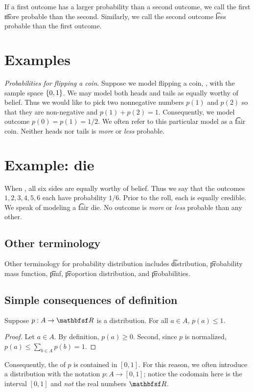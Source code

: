 If a first outcome has a larger probability than a second outcome, we call the first \t{more probable} than the second.
Similarly, we call the second outcome \t{less probable} than the first outcome.

\section*{Examples}

\textit{Probabilities for flipping a coin}.
Suppose we model flipping a coin, , with the sample space $\{0,1\}$.
We may model both heads and tails as equally worthy of belief.
Thus we would like to pick two nonnegative numbers $p(1)$ and $p(2)$ so that they are non-negative and $p(1) + p(2) = 1$.
Consequently, we model outcome $p(0) = p(1) = 1/2 $.
We often refer to this particular model as a \t{fair coin}.
Neither heads nor tails is \textit{more} or \textit{less} probable.

\section*{Example: die}

When , all six sides are equally worthy of belief.
Thus we say that the outcomes $1, 2, 3, 4, 5, 6$ each have probability $1/6 $.
Prior to the roll, each is equally credible.
We speak of modeling a \t{fair die}.
No outcome is \textit{more} or \textit{less} probable than any other.

\subsection*{Other terminology}

Other terminology for probability distribution includes \t{distribution}, \t{probability mass function}, \t{pmf}, \t{proportion distribution}, and \t{probabilities}.
\subsection*{Simple consequences of definition}

\begin{proposition}
Suppose $p: A \to \R $ is a distribution.
For all $a \in A$, $p(a) \leq 1$.
\begin{proof}Let $a \in A$.
By definition, $p(a) \geq 0$.
Second, since $p$ is normalized, $p(a) \leq \sum_{b \in A} p(b) = 1$.\end{proof}
\end{proposition}

Consequently, the of $p$ is contained in $[0,1]$.
For this reason, we often introduce a distribution with the notation $p: A \to [0,1]$; notice the codomain here is the interval $[0,1]$ and \textit{not} the real numbers $\R $.
